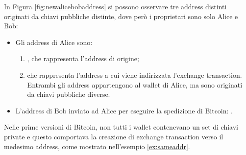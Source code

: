 \begin{example}
    In Figura \ref{fig:newalicebobaddress} si possono osservare tre address distinti originati da chiavi pubbliche distinte, dove però i proprietari sono solo Alice e Bob:
    \begin{itemize}
      \item Gli address di Alice sono:
      \begin{enumerate}
      \item {}, che rappresenta l’address di origine;

      \item {} che rappresenta l’address a cui viene indirizzata l’exchange transaction. Entrambi gli address appartengono al wallet di Alice, ma sono originati da chiavi pubbliche diverse.
      \end{enumerate}
      \item L’address di Bob inviato ad Alice per eseguire la spedizione di Bitcoin: .
    \end{itemize}
  \end{example}

Nelle prime versioni di Bitcoin, non tutti i wallet contenevano un set di chiavi private e questo comportava la creazione di exchange transaction verso il medesimo address, come mostrato nell'esempio \ref{ex:sameaddr}.

